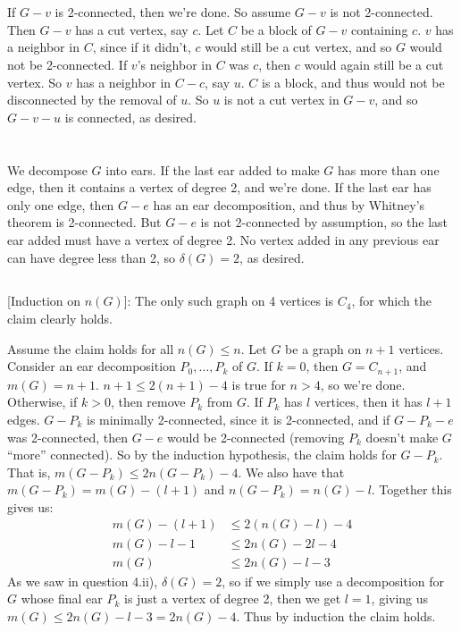 \documentclass[11pt]{article}
\begin{document}
\section{} %
If $G-v$ is 2-connected, then we're done. So assume $G-v$ is not 2-connected.
Then $G-v$ has a cut vertex, say $c$. Let $C$ be a block of $G-v$ containing
$c$. $v$ has a neighbor in $C$, since if it didn't, $c$ would still be a cut
vertex, and so $G$ would not be 2-connected. If $v$'s neighbor in $C$ was $c$,
then $c$ would again still be a cut vertex. So $v$ has a neighbor in $C-c$,
say $u$. $C$ is a block, and thus would not be disconnected by the removal of
$u$. So $u$ is not a cut vertex in $G-v$, and so $G-v-u$ is connected, as
desired.


\section{} %
\subsection{} %
We decompose $G$ into ears. If the last ear added to make $G$ has more than
one edge, then it contains a vertex of degree 2, and we're done. If the last
ear has only one edge, then $G-e$ has an ear decomposition, and thus by
Whitney's theorem is 2-connected. But $G-e$ is not 2-connected by assumption,
so the last ear added must have a vertex of degree 2. No vertex added in any
previous ear can have degree less than 2, so $\delta(G)=2$, as desired.


\subsection{} %
[Induction on $n(G)$]: The only such graph on 4 vertices is $C_4$, for which
the claim clearly holds.

Assume the claim holds for all $n(G)\le n$. Let $G$ be a graph on $n+1$
vertices. Consider an ear decomposition $P_0,\ldots,P_k$ of $G$. If $k=0$,
then $G=C_{n+1}$, and $m(G)=n+1$. $n+1\le2(n+1)-4$ is true for $n>4$, so we're
done. Otherwise, if $k>0$, then remove $P_k$ from $G$. If $P_k$ has $l$
vertices, then it has $l+1$ edges. $G-P_k$ is minimally 2-connected, since it
is 2-connected, and if $G-P_k-e$ was 2-connected, then $G-e$ would be
2-connected (removing $P_k$ doesn't make $G$ ``more'' connected). So by
the induction hypothesis, the claim holds for $G-P_k$. That is,
$m(G-P_k)\le2n(G-P_k)-4$.  We also have that $m(G-P_k)=m(G)-(l+1)$ and
$n(G-P_k)=n(G)-l$. Together this gives us:
\begin{align*}
	m(G)-(l+1)&\le2(n(G)-l)-4\\
	m(G)-l-1&\le2n(G)-2l-4\\
	m(G)&\le2n(G)-l-3
\end{align*}
As we saw in question 4.ii), $\delta(G)=2$, so if we simply use a
decomposition for $G$ whose final ear $P_k$ is just a vertex of degree 2, then
we get $l=1$, giving us $m(G)\le2n(G)-l-3=2n(G)-4$. Thus by induction the
claim holds.
\end{document}
